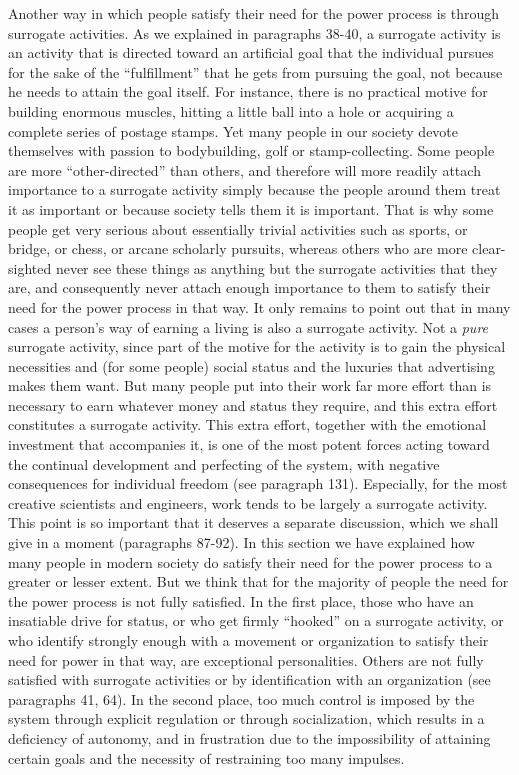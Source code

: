  Another way in which people satisfy their need for the power process is through surrogate activities. As we explained in paragraphs 38-40, a surrogate activity is an activity that is directed toward an artificial goal that the individual pursues for the sake of the “fulfillment” that he gets from pursuing the goal, not because he needs to attain the goal itself. For instance, there is no practical motive for building enormous muscles, hitting a little ball into a hole or acquiring a complete series of postage stamps. Yet many people in our society devote themselves with passion to bodybuilding, golf or stamp-collecting. Some people are more “other-directed” than others, and therefore will more readily attach importance to a surrogate activity simply because the people around them treat it as important or because society tells them it is important. That is why some people get very serious about essentially trivial activities such as sports, or bridge, or chess, or arcane scholarly pursuits, whereas others who are more clear-sighted never see these things as anything but the surrogate activities that they are, and consequently never attach enough importance to them to satisfy their need for the power process in that way. It only remains to point out that in many cases a person’s way of earning a living is also a surrogate activity. Not a {\em pure} surrogate activity, since part of the motive for the activity is to gain the physical necessities and (for some people) social status and the luxuries that advertising makes them want. But many people put into their work far more effort than is necessary to earn whatever money and status they require, and this extra effort constitutes a surrogate activity. This extra effort, together with the emotional investment that accompanies it, is one of the most potent forces acting toward the continual development and perfecting of the system, with negative consequences for individual freedom (see paragraph 131). Especially, for the most creative scientists and engineers, work tends to be largely a surrogate activity. This point is so important that it deserves a separate discussion, which we shall give in a moment (paragraphs 87-92).
 In this section we have explained how many people in modern society do satisfy their need for the power process to a greater or lesser extent. But we think that for the majority of people the need for the power process is not fully satisfied. In the first place, those who have an insatiable drive for status, or who get firmly “hooked” on a surrogate activity, or who identify strongly enough with a movement or organization to satisfy their need for power in that way, are exceptional personalities. Others are not fully satisfied with surrogate activities or by identification with an organization (see paragraphs 41, 64). In the second place, too much control is imposed by the system through explicit regulation or through socialization, which results in a deficiency of autonomy, and in frustration due to the impossibility of attaining certain goals and the necessity of restraining too many impulses.
